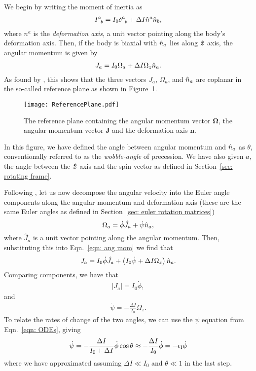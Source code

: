 \documentclass[../full_thesis/full_thesis.tex]{subfiles}
\begin{document}
We begin by writing the moment of inertia as
\begin{align}
I^{a}_{\;\;b} = I_{0} \delta^{a}_{\;\;b} + \Delta I \hat{n}^a \hat{n}_b,
\end{align}
where $n^a$ is the \emph{deformation axis}, a unit vector pointing along the
body's deformation axis. Then, if the body is biaxial with $\hat{n}_{a}$ lies along
$\boldsymbol{\hat{z}}$ axis, the angular momentum is given by
\begin{align}
J_{a} = I_0 \Omega_a + \Delta I \Omega_z \hat{n}_a.
\label{eqn: ang mom}
\end{align}
As found by \citet{Pines1972}, this shows that the three vectors $J_a$,
$\Omega_a$, and $\hat{n}_a$ are coplanar in the so-called reference plane as shown in
Figure~\ref{fig: reference plane}.
\begin{figure}[htb]
    \texttt{[image: ReferencePlane.pdf]}
    \caption{The reference plane containing the angular momentum vector $\mathbf{\Omega}$,
    the angular momentum vector $\mathbf{J}$ and the deformation axis $\mathbf{n}$.}
    \label{fig: reference plane}
\end{figure}
In this figure, we have defined the angle between angular momentum and $\hat{n}_a$ as
$\theta$, conventionally referred to as the \emph{wobble-angle} of
precession. We have also given $a$, the angle between the $\boldsymbol{\hat{z}}$-axis and the
spin-vector as defined in Section~\ref{sec: rotating frame}.

Following \citet{Jones2001}, let us now decompose the angular velocity into the
Euler angle components along the angular momentum and deformation axis (these
are the same Euler angles as defined in Section~\ref{sec: euler rotation
matrices})
\begin{equation}
  \Omega_a = \dot{\phi}\hat{J}_a + \dot{\psi}\hat{n}_{a},
\label{eqn: decomp}
\end{equation}
where $\hat{J}_a$ is a unit vector pointing along the angular momentum. Then,
substituting this into Eqn.~\eqref{eqn: ang mom} we find that
\begin{align}
J_a = I_0 \dot{\phi} \hat{J}_a + \left(I_0 \dot{\psi} + \Delta I \Omega_z\right)\hat{n}_a.
\end{align}
Comparing components, we have that
\begin{align}
|J_a| = I_0 \dot{\phi},
\end{align}
and
\begin{align}
\dot{\psi} = -\frac{\Delta I}{I_0} \Omega_z.
\end{align}
To relate the rates of change of the two angles, we can use the $\dot{\psi}$
equation from Eqn.~\eqref{eqn: ODEs}, giving
\begin{align}
\dot{\psi} = - \frac{\Delta I}{I_0 + \Delta I} \dot{\phi} \cos\theta
\approx -\frac{\Delta I}{I_0} \dot{\phi} = -\epsilon_{\mathrm{I}} \dot{\phi}
\label{eqn: psi phi}
\end{align}
where we have approximated assuming $\Delta I \ll I_0$ and $\theta \ll 1$ in
the last step.
\end{document}
